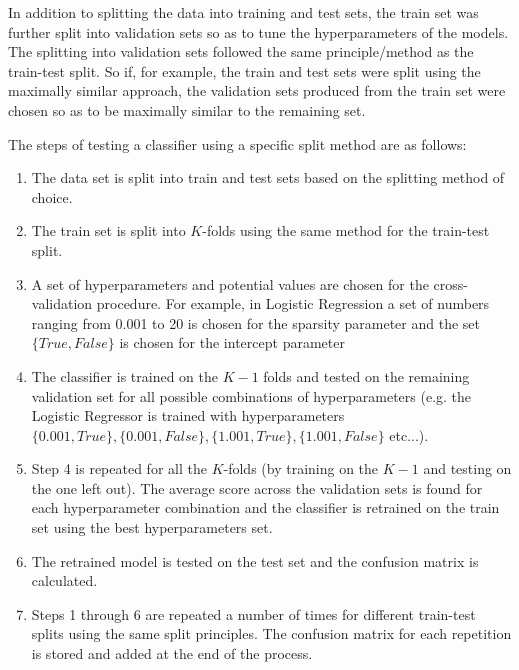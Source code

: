 In addition to splitting the data into training and test sets, the train set was further split into validation sets so as to tune the hyperparameters of the models. The splitting into validation sets followed the same principle/method as the train-test split. So if, for example, the train and test sets were split using the maximally similar approach, the validation sets produced from the train set were chosen so as to be maximally similar to the remaining set.


The steps of testing a classifier using a specific split method are as follows:
\begin{enumerate}
\item The data set is split into train and test sets based on the splitting method of choice. 
\item The train set is split into $K$-folds using the same method for the train-test split.
\item A set of hyperparameters and potential values are chosen for the cross-validation procedure. For example, in Logistic Regression a set of numbers ranging from 0.001 to 20 is chosen for the sparsity parameter and the set $\{True,False\}$ is chosen for the intercept parameter    
\item The classifier is trained on the $K-1$ folds and tested on the remaining validation set for all possible combinations of hyperparameters (e.g. the Logistic Regressor is trained with hyperparameters $\{0.001,True\},\{0.001,False\},\{1.001,True\},\{1.001,False\}$ etc...).
\item Step 4 is repeated for all the $K$-folds (by training on the $K-1$ and testing on the one left out). The average score across the validation sets is found for each hyperparameter combination and the classifier is retrained on the train set using the best hyperparameters set.
\item The retrained model is tested on the test set and the confusion matrix is calculated.
\item Steps  1 through 6 are repeated a number of times for different train-test splits using the same split principles. The confusion matrix for each repetition is stored and added at the end of the process.  
\end{enumerate}


